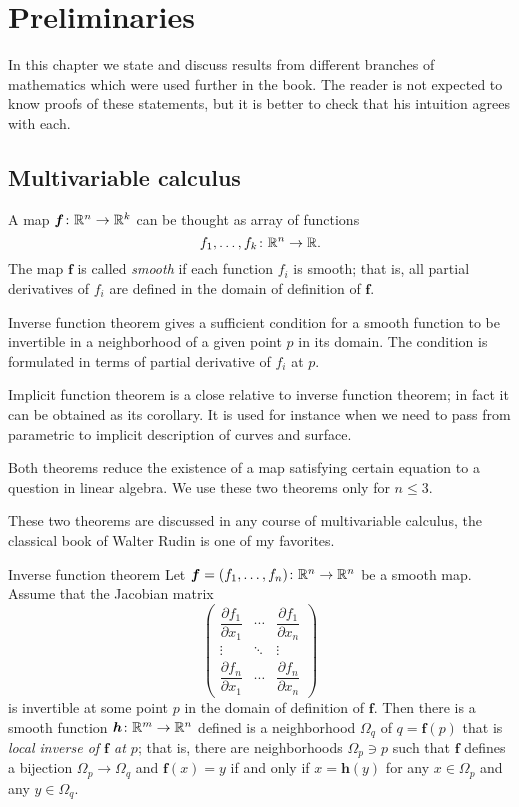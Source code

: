 \chapter{Preliminaries}

In this chapter we state and discuss results from different branches of mathematics which were used further in the book.
The reader is not expected to know proofs of these statements, but it is better to check that his intuition agrees with each.  

\section*{Multivariable calculus}

A map $\bm{f}\colon\mathbb{R}^n\to\mathbb{R}^k$ can be thought as array of functions 
\[f_1,\dots,f_k\colon\mathbb{R}^n\to \mathbb{R}.\]
The map $\bm{f}$ is called \emph{smooth} if each function $f_i$ is smooth;
that is, all partial derivatives of $f_i$ are defined in the domain of definition of $\bm{f}$.

Inverse function theorem gives a sufficient condition for a smooth function to be invertible in a neighborhood of a given point $p$ in its domain.
The condition is formulated in terms of partial derivative of $f_i$ at $p$.

Implicit function theorem is a close relative to inverse function theorem;
in fact it can be obtained as its corollary.
It is used for instance when we need to pass from parametric to implicit description of curves and surface.

Both theorems reduce the existence of a map satisfying certain equation to a question in linear algebra. 
We use these two theorems only for $n\le 3$.

These two theorems are discussed in any course of multivariable calculus, the classical book of Walter Rudin \cite{rudin} is one of my favorites.

\begin{thm}{Inverse function theorem}
Let $\bm{f}=(f_1,\dots,f_n)\colon\mathbb{R}^n\to\mathbb{R}^n$ be a smooth map.
Assume that the Jacobian matrix
\[
\begin{pmatrix}
\dfrac{\partial f_1}{\partial x_1} & \cdots & \dfrac{\partial f_1}{\partial x_n}\\
\vdots & \ddots & \vdots\\
\dfrac{\partial f_n}{\partial x_1} & \cdots & \dfrac{\partial f_n}{\partial x_n} \end{pmatrix}\]
is invertible at some point $p$ in the domain of definition of $\bm{f}$.
Then there is a smooth function $\bm{h}\colon\mathbb{R}^m\to\mathbb{R}^n$ defined is a neighborhood $\Omega_q$ of $q=\bm{f}(p)$ that is \emph{local inverse of $\bm{f}$ at $p$};
that is, there are neighborhoods $\Omega_p\ni p$ such that
$\bm{f}$ defines a bijection $\Omega_p\to \Omega_q$ and
$\bm{f}(x)=y$ if and only if $x=\bm{h}(y)$ for any $x\in \Omega_p$ and any $y\in \Omega_q$.
\end{thm}

